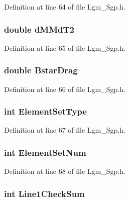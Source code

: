 Definition at line 64 of file Lgm\_\-Sgp.h.\hypertarget{struct___sgp_t_l_e_eaac5f4f09ca804c3373fe4f78e8a96b}{
\subsubsection[{dMMdT2}]{\setlength{\rightskip}{0pt plus 5cm}double {\bf dMMdT2}}}
\label{struct___sgp_t_l_e_eaac5f4f09ca804c3373fe4f78e8a96b}




Definition at line 65 of file Lgm\_\-Sgp.h.\hypertarget{struct___sgp_t_l_e_542efb643c91709b678e9a08a27d9e40}{
\subsubsection[{BstarDrag}]{\setlength{\rightskip}{0pt plus 5cm}double {\bf BstarDrag}}}
\label{struct___sgp_t_l_e_542efb643c91709b678e9a08a27d9e40}




Definition at line 66 of file Lgm\_\-Sgp.h.\hypertarget{struct___sgp_t_l_e_c036ab9b5a5d2885f7739225bdebfe4e}{
\subsubsection[{ElementSetType}]{\setlength{\rightskip}{0pt plus 5cm}int {\bf ElementSetType}}}
\label{struct___sgp_t_l_e_c036ab9b5a5d2885f7739225bdebfe4e}




Definition at line 67 of file Lgm\_\-Sgp.h.\hypertarget{struct___sgp_t_l_e_792ff599d71797b42592d89cc27fa00c}{
\subsubsection[{ElementSetNum}]{\setlength{\rightskip}{0pt plus 5cm}int {\bf ElementSetNum}}}
\label{struct___sgp_t_l_e_792ff599d71797b42592d89cc27fa00c}




Definition at line 68 of file Lgm\_\-Sgp.h.\hypertarget{struct___sgp_t_l_e_43803c19029852338bbb6ec4b9c13381}{
\subsubsection[{Line1CheckSum}]{\setlength{\rightskip}{0pt plus 5cm}int {\bf Line1CheckSum}}}
\label{struct___sgp_t_l_e_43803c19029852338bbb6ec4b9c13381}




